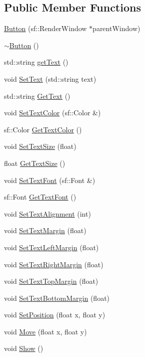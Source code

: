 \subsection*{Public Member Functions}
\begin{CompactItemize}
\item 
\hyperlink{classsfgui_1_1Button_05c78461b775a073bed1e218586defd7}{Button} (sf::RenderWindow $\ast$parentWindow)
\item 
\hyperlink{classsfgui_1_1Button_835b0cbc92ef98e4c884398e036d26ca}{$\sim$Button} ()
\item 
std::string \hyperlink{classsfgui_1_1Button_015166159ef486c5001c5b58e79abc2d}{getText} ()
\item 
void \hyperlink{classsfgui_1_1Button_48ddf97b9a9f77517f5bf70e93df2b80}{SetText} (std::string text)
\item 
std::string \hyperlink{classsfgui_1_1Button_f731f8fe61ce30a7e405d8d3a56c5f22}{GetText} ()
\item 
void \hyperlink{classsfgui_1_1Button_af73ff1983944ea0969bf5c7421725c5}{SetTextColor} (sf::Color \&)
\item 
sf::Color \hyperlink{classsfgui_1_1Button_7eca4b2322ce0785e64bd2932912b974}{GetTextColor} ()
\item 
void \hyperlink{classsfgui_1_1Button_eed26d1a50f825f24ef1f2a16ef0b425}{SetTextSize} (float)
\item 
float \hyperlink{classsfgui_1_1Button_ed3a5fc8690d92ee59483b5dd7de6dbf}{GetTextSize} ()
\item 
void \hyperlink{classsfgui_1_1Button_f1a92c908326f7bd9973da154854a8bd}{SetTextFont} (sf::Font \&)
\item 
sf::Font \hyperlink{classsfgui_1_1Button_8b3a0a7ac0482c039e11bb615a55e86b}{GetTextFont} ()
\item 
void \hyperlink{classsfgui_1_1Button_c1c0fe577ad7bfa1367ad406ae087bd1}{SetTextAlignment} (int)
\item 
void \hyperlink{classsfgui_1_1Button_af84ec76e02e12c55667b960d80cc90b}{SetTextMargin} (float)
\item 
void \hyperlink{classsfgui_1_1Button_94b8976462b04b1a0e63542dd49aa7c8}{SetTextLeftMargin} (float)
\item 
void \hyperlink{classsfgui_1_1Button_4a4b4c339d001a0578c5e70b01ef164b}{SetTextRightMargin} (float)
\item 
void \hyperlink{classsfgui_1_1Button_cd571ac750ad4f9f957da40fb1ae23d7}{SetTextTopMargin} (float)
\item 
void \hyperlink{classsfgui_1_1Button_18a553fdcfbcf42d7764d3e039a72708}{SetTextBottomMargin} (float)
\item 
void \hyperlink{classsfgui_1_1Button_4160a1abdec76e06db9b34b80f5fa12c}{SetPosition} (float x, float y)
\item 
void \hyperlink{classsfgui_1_1Button_be36461c2e85c67b6cc42f3a6cba0468}{Move} (float x, float y)
\item 
void \hyperlink{classsfgui_1_1Button_94dc6919349ff5ca9f334cce78afbe39}{Show} ()
\end{CompactItemize}
